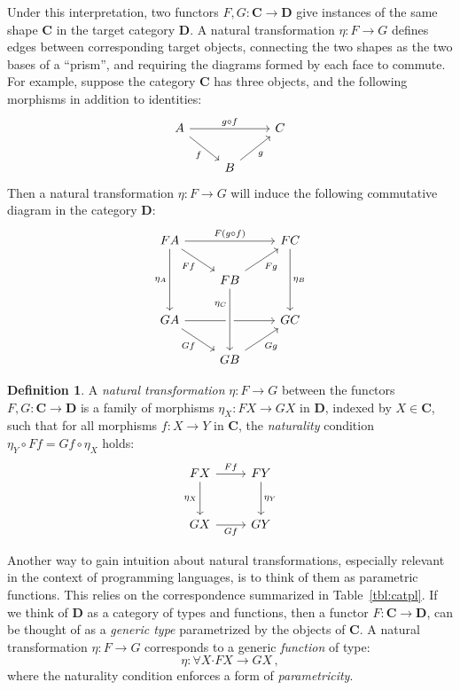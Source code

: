 \documentclass[11pt,oneside,draft]{book}
\theoremstyle{definition}
\newtheorem{definition}[theorem]{Definition}
\newcommand{\bdot}{\boldsymbol{\cdot}}
\begin{document}
Under this interpretation,
two functors $F, G : \mathbf{C} \rightarrow \mathbf{D}$
give instances of the same shape $\mathbf{C}$
in the target category $\mathbf{D}$.
A natural transformation $\eta : F \rightarrow G$
defines edges between corresponding target objects,
connecting the two shapes as the two bases of a ``prism'',
and requiring the diagrams formed by each face to commute.
For example, suppose the category $\mathbf{C}$ has three objects,
and the following morphisms in addition to identities:
\[
  \begin{tikzcd}
    A \ar[rr, "g \circ f"] \ar[rd, "f"'] & & C \\
    & B \ar[ur, "g"']
  \end{tikzcd}
\]
Then a natural transformation $\eta : F \rightarrow G$
will induce the following commutative diagram in the category $\mathbf{D}$:
\[
  \begin{tikzcd}
    F A \ar[dd, "\eta_A"'] \ar[rr, "F (g \circ f)"] \ar[rd, "F f"'] & &
    F C \ar[dd, "\eta_B"] \\
    & F B \ar[ur, "F g"'] \\
    G A \ar[rr] \ar[rd, "G f"'] & & G C \\
    & G B \ar[ur, "G g"'] \ar[uu, <-, crossing over, near end, "\eta_C"]
  \end{tikzcd}
\]

\begin{definition} \label{def:nattrans} %
A \emph{natural transformation} $\eta : F \rightarrow G$ between
the functors $F, G : \mathbf{C} \rightarrow \mathbf{D}$
is a family of morphisms $\eta_X : F X \rightarrow G X$ in ${\mathbf{D}}$,
indexed by $X \in \mathbf{C}$,
such that for all morphisms
$f : X \rightarrow Y$ in $\mathbf{C}$,
the \emph{naturality} condition
$\eta_Y \circ F f = G f \circ \eta_X$
holds:
\[
  \begin{tikzcd}[row sep=large]
    F X \ar[r, "F f"] \ar[d, "\eta_X"'] & F Y \ar[d, "\eta_Y"] \\
    G X \ar[r, "G f"'] & G Y
  \end{tikzcd}
\]
\end{definition}

Another way to gain intuition about natural transformations,
especially relevant in the context of programming languages,
is to think of them as parametric functions.
This relies on the correspondence summarized in Table~\ref{tbl:catpl}.
If we think of $\mathbf{D}$ as a category of types and functions,
then a functor
$F : \mathbf{C} \rightarrow \mathbf{D}$,
can be thought of as a \emph{generic type}
parametrized by the objects of $\mathbf{C}$.
A natural transformation $\eta : F \rightarrow G$
corresponds to a generic \emph{function} of type:
\[
  \eta : \forall X \bdot
    F X \rightarrow G X
  \,,
\]
where the naturality condition
enforces a form of \emph{parametricity}.
\end{document}
